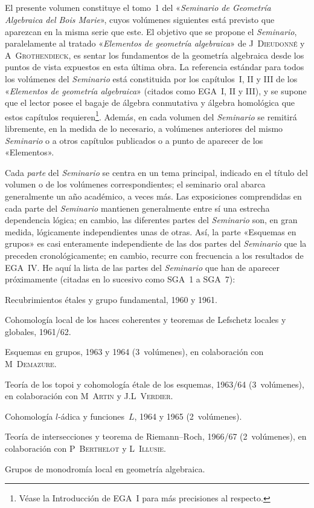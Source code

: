 \subsection{}
\label{I.introduction.2}

El presente volumen constituye el tomo~1 del «\emph{Seminario de Geometría Algebraica del Bois Marie}», cuyos volúmenes siguientes está previsto que aparezcan en la misma serie que este. El objetivo que se propone el \emph{Seminario}, paralelamente al tratado «\emph{Elementos de geometría algebraica}» de J\ptbl\ \textsc{Dieudonné} y A\ptbl\ \textsc{Grothendieck}, es sentar los fundamentos de la geometría algebraica desde los puntos de vista expuestos en esta última obra. La referencia estándar para todos los volúmenes del \emph{Seminario} está constituida por los capítulos~I, II y III de los «\emph{Elementos de geometría algebraica}» (citados como EGA~I, II y III), y se supone que el lector posee el bagaje de álgebra conmutativa y álgebra homológica que estos capítulos requieren\footnote{Véase la Introducción de EGA~I para más precisiones al respecto.}. Además, en cada volumen del \emph{Seminario} se remitirá libremente, en la medida de lo necesario, a volúmenes anteriores del mismo \emph{Seminario} o a otros capítulos publicados o a punto de aparecer de los «Elementos».

Cada \emph{parte} del \emph{Seminario} se centra en un tema principal, indicado en el título del volumen o de los volúmenes correspondientes; el seminario oral abarca generalmente un año académico, a veces más. Las exposiciones comprendidas en cada parte del \emph{Seminario} mantienen generalmente entre sí una estrecha dependencia lógica; en cambio, las diferentes partes del \emph{Seminario} son, en gran medida, lógicamente independientes unas de otras. Así, la parte «Esquemas en grupos» es casi enteramente independiente de las dos partes del \emph{Seminario} que la preceden cronológicamente; en cambio, recurre con frecuencia a los resultados de EGA~IV. He aquí la lista de las partes del \emph{Seminario} que han de aparecer próximamente (citadas en lo sucesivo como SGA~1 a SGA~7):
\begin{enumerateb}
\item[SGA 1.] Recubrimientos étales y grupo fundamental, 1960 y 1961.
\item[SGA 2.] Cohomología local de los haces coherentes y teoremas de Lefschetz locales y globales, 1961/62.
\item[SGA 3.] Esquemas en grupos, 1963 y 1964 (3~volúmenes), en colaboración con M\ptbl\ \textsc{Demazure}.
\item[SGA 4.] Teoría de los topoi y cohomología étale de los esquemas, 1963/64 (3~volúmenes), en colaboración con M\ptbl\ \textsc{Artin} y J.L\ptbl\ \textsc{Verdier}.
\item[SGA 5.] Cohomología $l$-ádica y funciones~$L$, 1964 y 1965 (2~volúmenes).
\item[SGA 6.] Teoría de intersecciones y teorema de Riemann--Roch, 1966/67 (2~volúmenes), en colaboración con P\ptbl\ \textsc{Berthelot} y L\ptbl\ \textsc{Illusie}.
\item[SGA 7.] Grupos de monodromía local en geometría algebraica.
\end{enumerateb}

